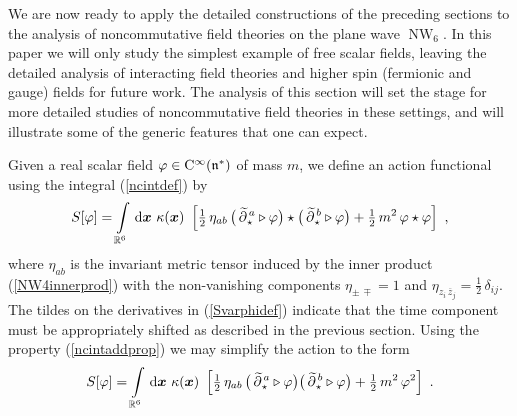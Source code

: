 \documentclass[11pt,a4paper]{article}
\DeclareMathOperator{\NW}{NW}
\newcommand{\1}{\mathbb{1}}
\newcommand{\mbf}[1]{{\boldsymbol {#1} }}
\def\dd{{\rm d}}
\def\CC{{\rm C}}
\def\mfn{{\mathfrak n}}
\newcommand{\R}{\real}
\newcommand{\real}{{\mathbb R}} %
\begin{document}
We are now ready to apply the detailed constructions of the preceding
sections to the analysis of noncommutative field theories on the plane
wave $\NW_6$. In this paper we will only study the simplest example of
free scalar fields, leaving the detailed analysis of interacting field
theories and higher spin (fermionic and gauge) fields for future
work. The analysis of this section will set the stage for more
detailed studies of noncommutative field theories in these settings,
and will illustrate some of the generic features that one can expect.

Given a real scalar field $\varphi\in\CC^\infty(\mfn^*)$ of mass $m$,
we define an action functional using the integral (\ref{ncintdef}) by
\begin{equation}
S[\varphi]=\int\limits_{\R^6}\,\dd\mbf x~\kappa(\mbf x)~\left[
\mbox{$\frac12$}\,\eta_{ab}\,\bigl(\,\widetilde
{\partial}{}^{\,a}_{\star}\triangleright\varphi\bigr)\star
\bigl(\,\widetilde{\partial}{}^{\,b}_{\star}\triangleright\varphi\bigr)+
\mbox{$\frac12$}\,m^2\,\varphi\star\varphi\right] \ ,
\label{Svarphidef}\end{equation}
where $\eta_{ab}$ is the invariant metric tensor induced by the inner
product (\ref{NW4innerprod}) with the non-vanishing components
$\eta_{\pm\,\mp}=1$ and $\eta_{z_i\,\overline{z}_j}=\frac12\,\delta_{ij}$. The
tildes on the derivatives in (\ref{Svarphidef}) indicate that the time
component must be appropriately shifted as described in the previous
section. Using the property (\ref{ncintaddprop}) we may simplify the
action to the form
\begin{equation}
S[\varphi]=\int\limits_{\R^6}\,\dd\mbf x~\kappa(\mbf x)~\left[
\mbox{$\frac12$}\,\eta_{ab}\,\bigl(\,\widetilde
{\partial}{}^{\,a}_{\star}\triangleright\varphi\bigr)
\bigl(\,\widetilde{\partial}{}^{\,b}_{\star}\triangleright\varphi\bigr)+
\mbox{$\frac12$}\,m^2\,\varphi^2\right] \ .
\label{Svarphisimpl}\end{equation}
\end{document}
